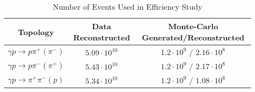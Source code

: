 \begin{table}[h!]
\begin{minipage}{\textwidth}
\begin{center}
\begin{singlespacing}

\caption[Number of Events Used in Efficiency Study]{\label{tab:eff_events}Number of Events Used in Efficiency Study \vspace{0.75mm}}

\begin{tabular}{c|c|c}

\hline
Topology & Data Reconstructed & Monte-Carlo Generated/Reconstructed \\
\hline
$\gamma p \rightarrow p \pi^+ (\pi^-)$ & $5.09\cdot10^{10}$ & $1.2\cdot10^9$ / $2.16\cdot10^8$ \\
$\gamma p \rightarrow p \pi^- (\pi^+)$ & $5.43\cdot10^{10}$ & $1.2\cdot10^9$ / $2.17\cdot10^8$ \\
$\gamma p \rightarrow \pi^+ \pi^- (p)$ & $5.34\cdot10^{10}$ & $1.2\cdot10^9$ / $1.08\cdot10^8$ \\
\hline \hline
\end{tabular}

\end{singlespacing}
\end{center}
\end{minipage}
\end{table}
\vspace{20pt}